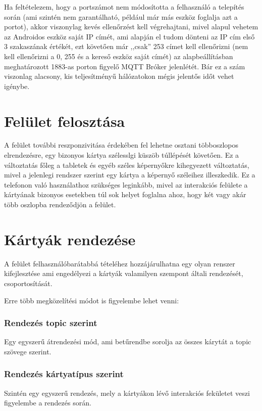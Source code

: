 \documentclass[
]{thesis-ekf}
\theoremstyle{definition}
\theoremstyle{remark}
\begin{document}
Ha feltételezem, hogy a portszámot nem módosította a felhasználó a telepítés során (ami szintén nem garantálható,
például már más eszköz foglalja azt a portot), akkor viszonylag kevés ellenőrzést kell végrehajtani, mivel alapul
vehetem az Androidos eszköz saját IP címét, ami alapján el tudom dönteni az IP cím első 3 szakaszának értékét,
ezt követően már ,,csak'' 253 címet kell ellenőrizni (nem kell ellenőrizni a 0, 255 és a kereső eszköz saját címét)
az alapbeállításban meghatározott 1883-as porton figyelő MQTT Bróker jelenlétét.
Bár ez a szám viszonlag alacsony, kis teljesítményű hálózatokon mégis jelentős időt vehet igénybe.

\section{Felület felosztása}
A felület további reszponzivitása érdekében fel lehetne osztani többoszlopos elrendezésre, egy bizonyos
kártya szélesslgi küszöb túllépését követően. Ez a változtatás főleg a tabletek és egyéb széles képernyőkre
kihegyezett változtatás, mivel a jelenlegi rendszer szerint egy kártya a képernyő széleihez illeszkedik.
Ez a telefonon való használathoz szükséges leginkább, mivel az interakciós felülete a kártyának bizonyos
esetekben túl sok helyet foglalna ahoz, hogy két vagy akár több oszlopba rendeződjön a felület.

\section{Kártyák rendezése}
A felület felhasználóbarátabbá tételéhez hozzájárulhatna egy olyan renszer kifejlesztése ami engedélyezi a
kártyák valamilyen szempont általi rendezését, csoportosítását.

Erre több megközelítési módot is figyelembe lehet venni:

\subsubsection{Rendezés topic szerint}
Egy egyszerű átrendezési mód, ami betűrendbe sorolja az összes kárytát a topic szövege szerint.

\subsubsection{Rendezés kártyatípus szerint}
Szintén egy egyszerű rendezés, mely a kártyákon lévő interakciós fekületet veszi figyelembe a rendezés során.
\end{document}
